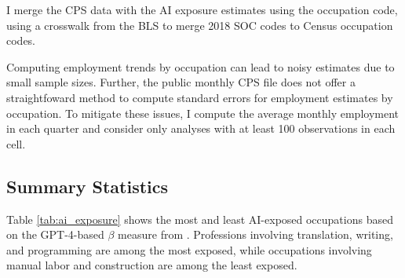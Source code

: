 \documentclass[12pt]{article}
\numberwithin{equation}{section}
\theoremstyle{theorem}\newcustomtheorem{theorem}{{\bf\sc Theorem}}
\theoremstyle{definition}\newcustomtheorem{assumption}{{\bf\sc Assumption}}
\theoremstyle{theorem} \newcustomtheorem{proposition}{{\bf\sc Proposition}}
\begin{document}
I merge the CPS data with the AI exposure estimates using the occupation code, using a crosswalk from the BLS to merge 2018 SOC codes to Census occupation codes. 

Computing employment trends by occupation can lead to noisy estimates due to small sample sizes. Further, the public monthly CPS file does not offer a straightfoward method to compute standard errors for employment estimates by occupation. To mitigate these issues, I compute the average monthly employment in each quarter and consider only analyses with at least 100 observations in each cell. 

\subsection{Summary Statistics}

Table \ref{tab:ai_exposure} shows the most and least AI-exposed occupations based on the GPT-4-based $\beta$ measure from \citet{eloundou_gpts_2024}. Professions involving translation, writing, and programming are among the most exposed, while occupations involving manual labor and construction are among the least exposed. 
\end{document}
